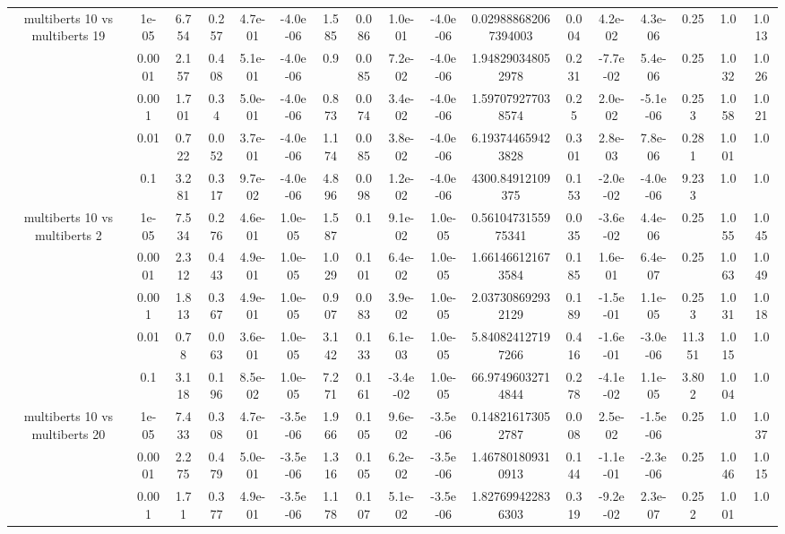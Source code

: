 \begin{tabular}{|c|c|c|c|c|c|c|c|c|c|c|c|c|c|c|c|c|}
\hline
\multirow{5}{*}{multiberts 10 vs multiberts 19} & 1e-05 & 6.754 & 0.257 & 4.7e-01 & -4.0e-06 & 1.585 & 0.086 & 1.0e-01 & -4.0e-06 & 0.029888682067394003 & 0.004 & 4.2e-02 & 4.3e-06 & 0.25 & 1.0 & 1.013 \\
 & 0.0001 & 2.157 & 0.408 & 5.1e-01 & -4.0e-06 & 0.9 & 0.085 & 7.2e-02 & -4.0e-06 & 1.948290348052978 & 0.231 & -7.7e-02 & 5.4e-06 & 0.25 & 1.032 & 1.026 \\
 & 0.001 & 1.701 & 0.34 & 5.0e-01 & -4.0e-06 & 0.873 & 0.074 & 3.4e-02 & -4.0e-06 & 1.597079277038574 & 0.25 & 2.0e-02 & -5.1e-06 & 0.253 & 1.058 & 1.021 \\
 & 0.01 & 0.722 & 0.052 & 3.7e-01 & -4.0e-06 & 1.174 & 0.085 & 3.8e-02 & -4.0e-06 & 6.193744659423828 & 0.301 & 2.8e-03 & 7.8e-06 & 0.281 & 1.001 & 1.0 \\
 & 0.1 & 3.281 & 0.317 & 9.7e-02 & -4.0e-06 & 4.896 & 0.098 & 1.2e-02 & -4.0e-06 & 4300.84912109375 & 0.153 & -2.0e-02 & -4.0e-06 & 9.233 & 1.0 & 1.0 \\
\hline
\multirow{5}{*}{multiberts 10 vs multiberts 2} & 1e-05 & 7.534 & 0.276 & 4.6e-01 & 1.0e-05 & 1.587 & 0.1 & 9.1e-02 & 1.0e-05 & 0.5610473155975341 & 0.035 & -3.6e-02 & 4.4e-06 & 0.25 & 1.055 & 1.045 \\
 & 0.0001 & 2.312 & 0.443 & 4.9e-01 & 1.0e-05 & 1.029 & 0.101 & 6.4e-02 & 1.0e-05 & 1.661466121673584 & 0.185 & 1.6e-01 & 6.4e-07 & 0.25 & 1.063 & 1.049 \\
 & 0.001 & 1.813 & 0.367 & 4.9e-01 & 1.0e-05 & 0.907 & 0.083 & 3.9e-02 & 1.0e-05 & 2.037308692932129 & 0.189 & -1.5e-01 & 1.1e-05 & 0.253 & 1.031 & 1.018 \\
 & 0.01 & 0.78 & 0.063 & 3.6e-01 & 1.0e-05 & 3.142 & 0.133 & 6.1e-03 & 1.0e-05 & 5.840824127197266 & 0.416 & -1.6e-01 & -3.0e-06 & 11.351 & 1.015 & 1.0 \\
 & 0.1 & 3.118 & 0.196 & 8.5e-02 & 1.0e-05 & 7.271 & 0.161 & -3.4e-02 & 1.0e-05 & 66.97496032714844 & 0.278 & -4.1e-02 & 1.1e-05 & 3.802 & 1.004 & 1.0 \\
\hline
\multirow{5}{*}{multiberts 10 vs multiberts 20} & 1e-05 & 7.433 & 0.308 & 4.7e-01 & -3.5e-06 & 1.966 & 0.105 & 9.6e-02 & -3.5e-06 & 0.148216173052787 & 0.008 & 2.5e-02 & -1.5e-06 & 0.25 & 1.0 & 1.037 \\
 & 0.0001 & 2.275 & 0.479 & 5.0e-01 & -3.5e-06 & 1.316 & 0.105 & 6.2e-02 & -3.5e-06 & 1.467801809310913 & 0.144 & -1.1e-01 & -2.3e-06 & 0.25 & 1.046 & 1.015 \\
 & 0.001 & 1.71 & 0.377 & 4.9e-01 & -3.5e-06 & 1.178 & 0.107 & 5.1e-02 & -3.5e-06 & 1.827699422836303 & 0.319 & -9.2e-02 & 2.3e-07 & 0.252 & 1.001 & 1.0 \\

\end{tabular}
